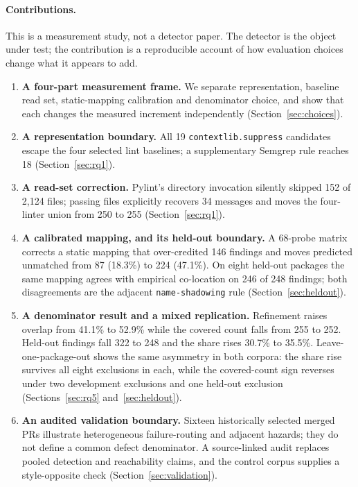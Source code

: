 \documentclass[10pt,a4paper]{article}
\begin{document}
\paragraph{Contributions.}
This is a measurement study, not a detector paper. The detector is the
object under test; the contribution is a reproducible account of how
evaluation choices change what it appears to add.
\begin{enumerate}[nosep,leftmargin=*]
\item \textbf{A four-part measurement frame.} We separate representation,
  baseline read set, static-mapping calibration and denominator choice,
  and show that each changes the measured increment independently
  (Section~\ref{sec:choices}).
\item \textbf{A representation boundary.} All 19
  \texttt{contextlib.suppress} candidates escape the four selected lint
  baselines; a supplementary Semgrep rule reaches 18
  (Section~\ref{sec:rq1}).
\item \textbf{A read-set correction.} Pylint's directory invocation
  silently skipped 152 of 2{,}124 files; passing files explicitly recovers
  34 messages and moves the four-linter union from 250 to 255
  (Section~\ref{sec:rq1}).
\item \textbf{A calibrated mapping, and its held-out boundary.} A 68-probe
  matrix corrects a static mapping that over-credited 146 findings and
  moves predicted unmatched from 87 (18.3\%) to 224 (47.1\%). On eight
  held-out packages the same mapping agrees with empirical co-location on
  246 of 248 findings; both disagreements are the adjacent
  \texttt{name-shadowing} rule (Section~\ref{sec:heldout}).
\item \textbf{A denominator result and a mixed replication.} Refinement
  raises overlap from 41.1\% to 52.9\% while the covered count falls from
  255 to 252. Held-out findings fall 322 to 248 and the share rises
  30.7\% to 35.5\%. Leave-one-package-out shows the same asymmetry in both
  corpora: the share rise survives all eight exclusions in each, while the
  covered-count sign reverses under two development exclusions and one
  held-out exclusion (Sections~\ref{sec:rq5} and~\ref{sec:heldout}).
\item \textbf{An audited validation boundary.} Sixteen historically selected
  merged PRs illustrate heterogeneous failure-routing and adjacent hazards;
  they do not define a common defect denominator. A source-linked audit
  replaces pooled detection and reachability claims, and the control corpus
  supplies a style-opposite check (Section~\ref{sec:validation}).
\end{enumerate}
\end{document}
